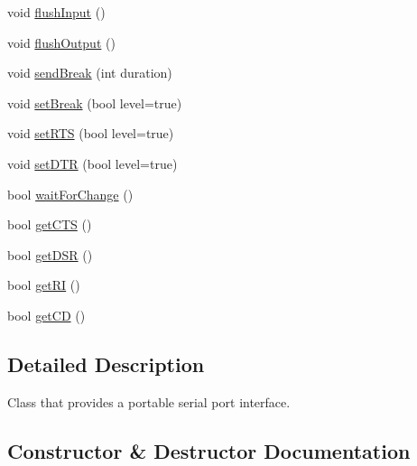 \begin{DoxyCompactItemize}
void \mbox{\hyperlink{classserial_1_1_serial_afa2c1f9114a37b7d140fc2292d1499b9}{flush\+Input}} ()
\item 
void \mbox{\hyperlink{classserial_1_1_serial_a256ee4bb93ab0e79d7a66b50f08dce53}{flush\+Output}} ()
\item 
void \mbox{\hyperlink{classserial_1_1_serial_ade90ff8f03525ea6d7b702fcd0f336de}{send\+Break}} (int duration)
\item 
void \mbox{\hyperlink{classserial_1_1_serial_a2a27912b1ca5cdad4a4aba7b9ddbc206}{set\+Break}} (bool level=true)
\item 
void \mbox{\hyperlink{classserial_1_1_serial_ab43ddc05e5d69ff2778f698aa7062370}{set\+R\+TS}} (bool level=true)
\item 
void \mbox{\hyperlink{classserial_1_1_serial_ac9b0bbf613a5fe68f05d1d40181a1bb3}{set\+D\+TR}} (bool level=true)
\item 
bool \mbox{\hyperlink{classserial_1_1_serial_a419dc984258956a5adb41fb8c86f5449}{wait\+For\+Change}} ()
\item 
bool \mbox{\hyperlink{classserial_1_1_serial_a809f048546c4c72b74e205139b97648c}{get\+C\+TS}} ()
\item 
bool \mbox{\hyperlink{classserial_1_1_serial_a6b9a0c485e1fe599dbb5e9e15b1a65d6}{get\+D\+SR}} ()
\item 
bool \mbox{\hyperlink{classserial_1_1_serial_afb96e6968f040c4bff7576095f4ba6e7}{get\+RI}} ()
\item 
bool \mbox{\hyperlink{classserial_1_1_serial_a9795a3e83e6745a14c64f657e68061fb}{get\+CD}} ()
\end{DoxyCompactItemize}


\subsection{Detailed Description}
Class that provides a portable serial port interface. 

\subsection{Constructor \& Destructor Documentation}
\mbox{\label{classserial_1_1_serial_aecbc4cc1723143805ae5a4aa79ba9332}} 
